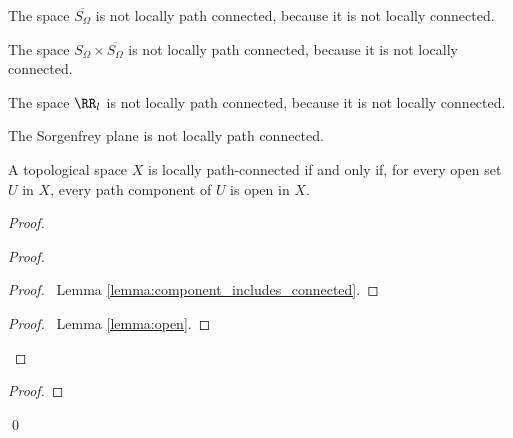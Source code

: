 \begin{example}
    The space $\overline{S_\Omega}$ is not locally path connected, because it is not locally connected.
\end{example}

\begin{example}
    The space $S_\Omega \times \overline{S_\Omega}$ is not locally path connected, because it is not locally connected.
\end{example}

\begin{example}
    The space $\RR_l$ is not locally path connected, because it is not locally connected.
\end{example}

\begin{corollary}
    The Sorgenfrey plane is not locally path connected.
\end{corollary}

\begin{theorem}
    \label{theorem:open_path_component_locally_path_connected}
    A topological space $X$ is locally path-connected if and only if, for every
    open set $U$ in $X$, every path component of $U$ is open in $X$.
\end{theorem}

\begin{proof}
    \pf
    \begin{proof}
        \begin{proof}
            \pf\ Lemma \ref{lemma:component_includes_connected}.
        \end{proof}
        \qedstep
        \begin{proof}
            \pf\ Lemma \ref{lemma:open}.
        \end{proof}
    \end{proof}
    \begin{proof}
    \end{proof}
    \qed
\end{proof}

